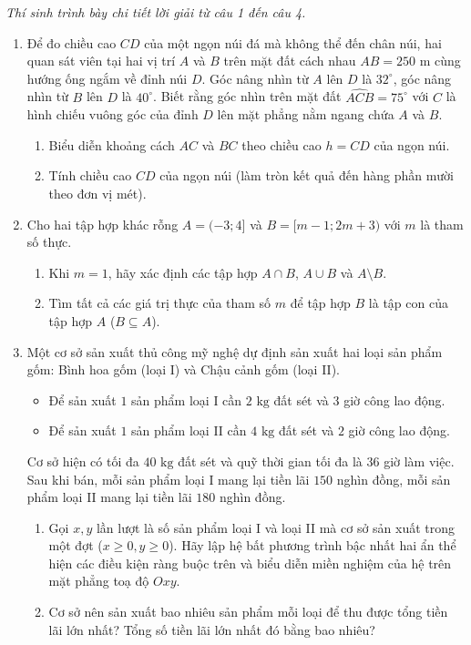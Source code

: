 \documentclass[12pt,a4paper]{article}
\newcommand{\parttitle}[1]{\par\vspace{1.5pt}\needspace{2\baselineskip}{\large\bfseries\color{ink}#1}\par\nopagebreak\vspace{1pt}}
\begin{document}
\parttitle{PHẦN IV. Tự luận}
\textit{Thí sinh trình bày chi tiết lời giải từ câu 1 đến câu 4.}
\begin{enumerate}
\item Để đo chiều cao $CD$ của một ngọn núi đá mà không thể đến chân núi, hai quan sát viên tại hai vị trí $A$ và $B$ trên mặt đất cách nhau $AB = 250\text{ m}$ cùng hướng ống ngắm về đỉnh núi $D$. Góc nâng nhìn từ $A$ lên $D$ là $32^\circ$, góc nâng nhìn từ $B$ lên $D$ là $40^\circ$. Biết rằng góc nhìn trên mặt đất $\widehat{ACB} = 75^\circ$ với $C$ là hình chiếu vuông góc của đỉnh $D$ lên mặt phẳng nằm ngang chứa $A$ và $B$.
\begin{enumerate}
    \item Biểu diễn khoảng cách $AC$ và $BC$ theo chiều cao $h = CD$ của ngọn núi.
    \item Tính chiều cao $CD$ của ngọn núi (làm tròn kết quả đến hàng phần mười theo đơn vị mét).
\end{enumerate}

\item Cho hai tập hợp khác rỗng $A = (-3; 4]$ và $B = [m - 1; 2m + 3)$ với $m$ là tham số thực.
\begin{enumerate}
    \item Khi $m = 1$, hãy xác định các tập hợp $A \cap B$, $A \cup B$ và $A \setminus B$.
    \item Tìm tất cả các giá trị thực của tham số $m$ để tập hợp $B$ là tập con của tập hợp $A$ ($B \subseteq A$).
\end{enumerate}

\item Một cơ sở sản xuất thủ công mỹ nghệ dự định sản xuất hai loại sản phẩm gốm: Bình hoa gốm (loại I) và Chậu cảnh gốm (loại II).
\begin{itemize}[leftmargin=1.5em, itemsep=0.1pt]
    \item Để sản xuất $1$ sản phẩm loại I cần $2\text{ kg}$ đất sét và $3$ giờ công lao động.
    \item Để sản xuất $1$ sản phẩm loại II cần $4\text{ kg}$ đất sét và $2$ giờ công lao động.
\end{itemize}
Cơ sở hiện có tối đa $40\text{ kg}$ đất sét và quỹ thời gian tối đa là $36$ giờ làm việc. Sau khi bán, mỗi sản phẩm loại I mang lại tiền lãi $150$ nghìn đồng, mỗi sản phẩm loại II mang lại tiền lãi $180$ nghìn đồng.
\begin{enumerate}
    \item Gọi $x, y$ lần lượt là số sản phẩm loại I và loại II mà cơ sở sản xuất trong một đợt ($x \ge 0, y \ge 0$). Hãy lập hệ bất phương trình bậc nhất hai ẩn thể hiện các điều kiện ràng buộc trên và biểu diễn miền nghiệm của hệ trên mặt phẳng toạ độ $Oxy$.
    \item Cơ sở nên sản xuất bao nhiêu sản phẩm mỗi loại để thu được tổng tiền lãi lớn nhất? Tổng số tiền lãi lớn nhất đó bằng bao nhiêu?
\end{enumerate}


\end{enumerate}
\end{document}
